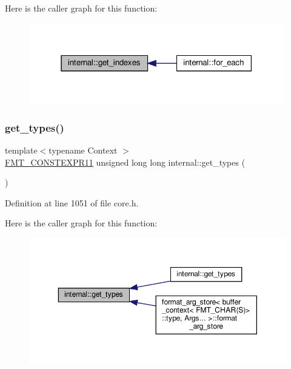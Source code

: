 Here is the caller graph for this function\+:
\nopagebreak
\begin{figure}[H]
\begin{center}
\leavevmode
\includegraphics[width=315pt]{namespaceinternal_aa8f32827bf5cced22ea13872d6058762_icgraph}
\end{center}
\end{figure}
\mbox{\label{namespaceinternal_aaa50494fe4b84c4924ef9506709813e8}} 
\subsubsection{\texorpdfstring{get\+\_\+types()}{get\_types()}\hspace{0.1cm}{\footnotesize\ttfamily [1/2]}}
{\footnotesize\ttfamily template$<$typename Context $>$ \\
\hyperlink{core_8h_a056f29fbe3ea234ac0cc417fb866a189}{F\+M\+T\+\_\+\+C\+O\+N\+S\+T\+E\+X\+P\+R11} unsigned long long internal\+::get\+\_\+types (\begin{DoxyParamCaption}{ }\end{DoxyParamCaption})}



Definition at line 1051 of file core.\+h.

Here is the caller graph for this function\+:
\nopagebreak
\begin{figure}[H]
\begin{center}
\leavevmode
\includegraphics[width=350pt]{namespaceinternal_aaa50494fe4b84c4924ef9506709813e8_icgraph}
\end{center}
\end{figure}
\mbox{\label{namespaceinternal_ac95af6018795359d47a7063b508fbd7b}} 

